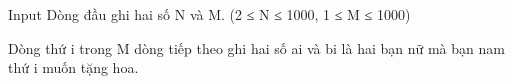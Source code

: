 Input
Dòng đầu ghi hai số N và M. (2 ≤ N ≤ 1000, 1 ≤ M ≤ 1000)  

   Dòng thứ i trong M dòng tiếp theo ghi hai số ai và bi là hai bạn nữ mà bạn nam thứ i muốn tặng hoa.
